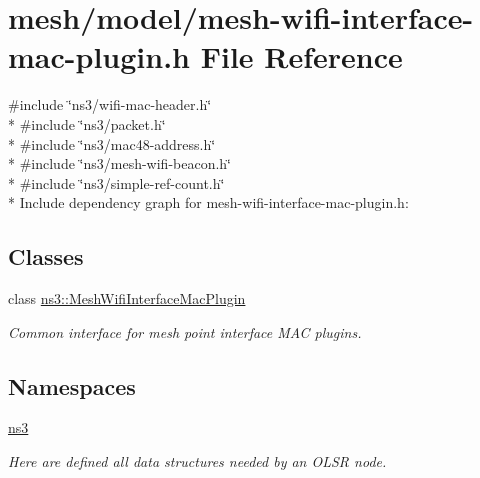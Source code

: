 \hypertarget{mesh-wifi-interface-mac-plugin_8h}{}\section{mesh/model/mesh-\/wifi-\/interface-\/mac-\/plugin.h File Reference}
\label{mesh-wifi-interface-mac-plugin_8h}
{\ttfamily \#include \char`\"{}ns3/wifi-\/mac-\/header.\+h\char`\"{}}\\*
{\ttfamily \#include \char`\"{}ns3/packet.\+h\char`\"{}}\\*
{\ttfamily \#include \char`\"{}ns3/mac48-\/address.\+h\char`\"{}}\\*
{\ttfamily \#include \char`\"{}ns3/mesh-\/wifi-\/beacon.\+h\char`\"{}}\\*
{\ttfamily \#include \char`\"{}ns3/simple-\/ref-\/count.\+h\char`\"{}}\\*
Include dependency graph for mesh-\/wifi-\/interface-\/mac-\/plugin.h\+:
\subsection*{Classes}
\begin{DoxyCompactItemize}
\item 
class \hyperlink{classns3_1_1MeshWifiInterfaceMacPlugin}{ns3\+::\+Mesh\+Wifi\+Interface\+Mac\+Plugin}
\begin{DoxyCompactList}\small\item\em Common interface for mesh point interface M\+AC plugins. \end{DoxyCompactList}\end{DoxyCompactItemize}
\subsection*{Namespaces}
\begin{DoxyCompactItemize}
\item 
 \hyperlink{namespacens3}{ns3}
\begin{DoxyCompactList}\small\item\em Here are defined all data structures needed by an O\+L\+SR node. \end{DoxyCompactList}\end{DoxyCompactItemize}
